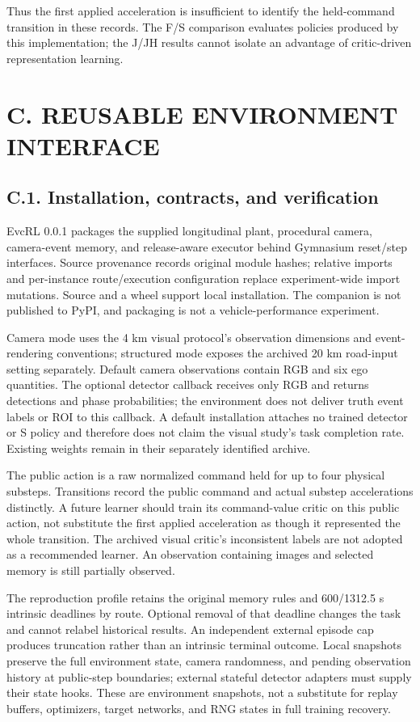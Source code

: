 \documentclass[letterpaper,journal,onecolumn]{IEEEtran}
\begin{document}
Thus the first applied acceleration is insufficient to identify the held-command transition in these records. The F/S comparison evaluates policies produced by this implementation; the J/JH results cannot isolate an advantage of critic-driven representation learning.

\FloatBarrier{}\section*{C. REUSABLE ENVIRONMENT INTERFACE}\setcounter{subsection}{0}

\subsection*{C.1. Installation, contracts, and verification}

EvcRL 0.0.1 packages the supplied longitudinal plant, procedural camera, camera-event memory, and release-aware executor behind Gymnasium reset/step interfaces. Source provenance records original module hashes; relative imports and per-instance route/execution configuration replace experiment-wide import mutations. Source and a wheel support local installation. The companion is not published to PyPI, and packaging is not a vehicle-performance experiment.

Camera mode uses the 4 km visual protocol's observation dimensions and event-rendering conventions; structured mode exposes the archived 20 km road-input setting separately. Default camera observations contain RGB and six ego quantities. The optional detector callback receives only RGB and returns detections and phase probabilities; the environment does not deliver truth event labels or ROI to this callback. A default installation attaches no trained detector or S policy and therefore does not claim the visual study's task completion rate. Existing weights remain in their separately identified archive.

The public action is a raw normalized command held for up to four physical substeps. Transitions record the public command and actual substep accelerations distinctly. A future learner should train its command-value critic on this public action, not substitute the first applied acceleration as though it represented the whole transition. The archived visual critic's inconsistent labels are not adopted as a recommended learner. An observation containing images and selected memory is still partially observed.

The reproduction profile retains the original memory rules and 600/1312.5 s intrinsic deadlines by route. Optional removal of that deadline changes the task and cannot relabel historical results. An independent external episode cap produces truncation rather than an intrinsic terminal outcome. Local snapshots preserve the full environment state, camera randomness, and pending observation history at public-step boundaries; external stateful detector adapters must supply their state hooks. These are environment snapshots, not a substitute for replay buffers, optimizers, target networks, and RNG states in full training recovery.
\end{document}
